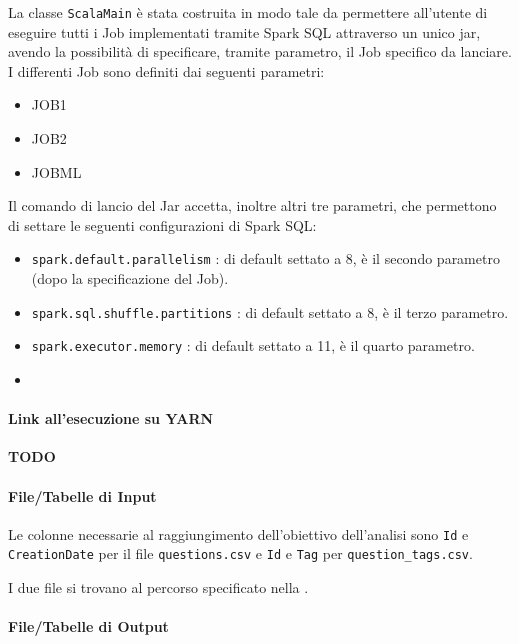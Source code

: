   La classe \texttt{ScalaMain} è stata costruita in modo tale da permettere all'utente di eseguire tutti i Job implementati tramite
  Spark SQL attraverso un unico jar, avendo la possibilità di specificare, tramite parametro, il Job specifico da lanciare.
  I differenti Job sono definiti dai seguenti parametri:
  \begin{itemize}
    \item JOB1
    \item JOB2
    \item JOBML
  \end{itemize}

  Il comando di lancio del Jar accetta, inoltre altri tre parametri, che permettono di settare le seguenti configurazioni di Spark SQL:
  \begin{itemize}
    \item \texttt{spark.default.parallelism} : di default settato a 8, è il secondo parametro (dopo la specificazione del Job).
    \item \texttt{spark.sql.shuffle.partitions} : di default settato a 8, è il terzo parametro.
    \item \texttt{spark.executor.memory} : di default settato a 11, è il quarto parametro.
  \item \end{itemize}

  \paragraph{Link all'esecuzione su YARN}\label{par:job1:spark:yarn}

  \textbf{TODO}

  \paragraph{File/Tabelle di Input}\label{par:job1:spark:input}

  Le colonne necessarie al raggiungimento dell'obiettivo dell'analisi sono \texttt{Id} e \texttt{CreationDate} per il file \texttt{questions.csv}
  e \texttt{Id} e \texttt{Tag} per \texttt{question\_tags.csv}.

  I due file si trovano al percorso specificato nella .

  \paragraph{File/Tabelle di Output}\label{par:job1:spark:output}

